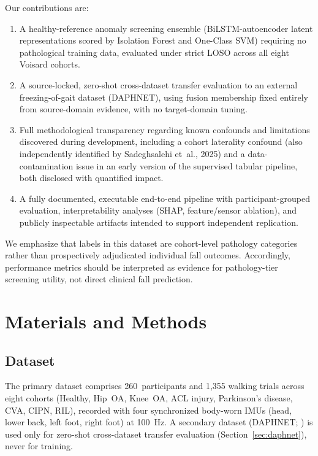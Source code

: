 Our contributions are:
\begin{enumerate}[leftmargin=*]
  \item A healthy-reference anomaly screening ensemble (BiLSTM-autoencoder latent representations scored by Isolation Forest and One-Class SVM) requiring no pathological training data, evaluated under strict LOSO across all eight Voisard cohorts.
  \item A source-locked, zero-shot cross-dataset transfer evaluation to an external freezing-of-gait dataset (DAPHNET), using fusion membership fixed entirely from source-domain evidence, with no target-domain tuning.
  \item Full methodological transparency regarding known confounds and limitations discovered during development, including a cohort laterality confound (also independently identified by Sadeghsalehi et~al., 2025) and a data-contamination issue in an early version of the supervised tabular pipeline, both disclosed with quantified impact.
  \item A fully documented, executable end-to-end pipeline with participant-grouped evaluation, interpretability analyses (SHAP, feature/sensor ablation), and publicly inspectable artifacts intended to support independent replication.
\end{enumerate}

We emphasize that labels in this dataset are cohort-level pathology categories rather than prospectively adjudicated individual fall outcomes. Accordingly, performance metrics should be interpreted as evidence for pathology-tier screening utility, not direct clinical fall prediction.

\section{Materials and Methods}

\subsection{Dataset}

The primary dataset \citep{voisard2025,voisard2025figshare} comprises 260~participants and 1{,}355 walking trials across eight cohorts (Healthy, Hip~OA, Knee~OA, ACL injury, Parkinson's disease, CVA, CIPN, RIL), recorded with four synchronized body-worn IMUs (head, lower back, left foot, right foot) at 100~Hz. A secondary dataset (DAPHNET; \cite{bachlin2010daphnet}) is used only for zero-shot cross-dataset transfer evaluation (Section~\ref{sec:daphnet}), never for training.

